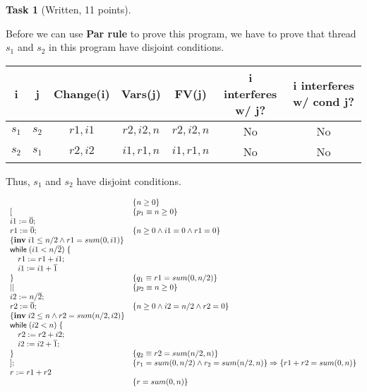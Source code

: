 \documentclass{article}
\newcommand{\stmt}[1]{\text{\sffamily #1}}
\newcommand{\while}[1]{\stmt{while}\;(#1)\;\{}
\newcommand{\assign}[2]{#1 := #2}
\newcommand{\const}[1]{\overline{#1}}
\newcommand{\inv}[1]{\{\textbf{inv}\;\ensuremath{#1}\}}
\theoremstyle{task}
\newtheorem{task}{Task}[section]
\begin{document}
\begin{task}[Written, 11 points]
\end{task}
Before we can use \textbf{Par rule} to prove this program, we have to prove
that thread $s_1$ and $s_2$ in this program have disjoint conditions.

\begin{center}
    \begin{tabular}{c | c | c | c | c | c | c}
        i & j & Change(i) & Vars(j) & FV(j) & i interferes w/ j? & i interferes w/ cond j? \\
        \hline
        $s_1$ & $s_2$ & $r1, i1$ & $r2, i2, n$ & $r2, i2, n$ & No & No \\
        $s_2$ & $s_1$ & $r2, i2$ & $i1, r1, n$ & $i1, r1, n$ & No & No \\
    \end{tabular}
\end{center}
Thus, $s_1$ and $s_2$ have disjoint conditions.

\[
    \begin{array}{l l}
        & \{n \geq 0 \} \\
        \lbrack & \{p_1 \equiv n \geq 0\} \\
        \assign{i1}{\const{0}}; & \\
        \assign{r1}{\const{0}}; & \{n \geq 0 \wedge i1 = 0 \wedge r1 = 0\} \\
        \inv{i1 \leq n/2 \wedge r1 = sum(0, i1)} & \\
        \while{i1 < n/\const{2}} & \\
        \quad \assign{r1}{r1 + i1}; & \\
        \quad \assign{i1}{i1 + \const{1}} \\
        \} & \{q_1 \equiv r1 = sum(0, n/2)\} \\
        || & \{p_2 \equiv n \geq 0\} \\
        \assign{i2}{n/\const{2}}; & \\
        \assign{r2}{\const{0}}; & \{n \geq 0 \wedge i2 = n/2 \wedge r2 = 0\} \\
        \inv{i2 \leq n \wedge r2 = sum(n/2, i2)} & \\
        \while{i2 < n} & \\
        \quad \assign{r2}{r2 + i2}; & \\
        \quad \assign{i2}{i2 + \const{1}}; & \\
        \} & \{q_2 \equiv r2 = sum(n/2, n)\} \\
        \rbrack; & \{r_1 = sum(0, n/2) \wedge r_2 = sum(n/2, n)\} \Rightarrow \{r1 + r2 = sum(0, n)\} \\
        \assign{r}{r1 + r2} & \\
        & \{r = sum(0, n)\}
    \end{array}
\]
\end{document}
